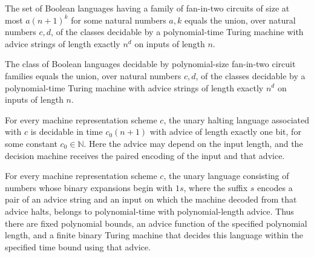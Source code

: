 \begin{theorem}
\label{Complexity.PPoly_eq_iUnion_DTIMEAdvice_pow}
\leanok
{}
The set of Boolean languages having a family of fan-in-two circuits of size at most
$a(n+1)^k$ for some natural numbers $a,k$ equals the union, over natural numbers $c,d$,
of the classes decidable by a polynomial-time Turing machine with advice strings of
length exactly $n^d$ on inputs of length $n$.
\end{theorem}

\begin{theorem}
\label{Complexity.PPoly_eq_iUnion_DTIMEAdvice_pow'}
\leanok
{}
The class of Boolean languages decidable by polynomial-size fan-in-two circuit families
equals the union, over natural numbers $c,d$, of the classes decidable by a
polynomial-time Turing machine with advice strings of length exactly $n^d$ on inputs of
length $n$.
\end{theorem}

\begin{theorem}
\label{Complexity.UHALT_mem_DTIMEAdvice_one}
\leanok
{}
For every machine representation scheme $c$, the unary halting language associated with
$c$ is decidable in time $c_0(n+1)$ with advice of length exactly one bit, for some
constant $c_0\in\mathbb{N}$. Here the advice may depend on the input length, and the
decision machine receives the paired encoding of the input and that advice.
\end{theorem}

\begin{theorem}
\label{Complexity.UHALT_mem_PAdvicePoly}
\leanok
{}
For every machine representation scheme $c$, the unary language consisting of numbers
whose binary expansions begin with $1s$, where the suffix $s$ encodes a pair of an
advice string and an input on which the machine decoded from that advice halts, belongs
to polynomial-time with polynomial-length advice. Thus there are fixed polynomial
bounds, an advice function of the specified polynomial length, and a finite binary
Turing machine that decides this language within the specified time bound using that
advice.
\end{theorem}
